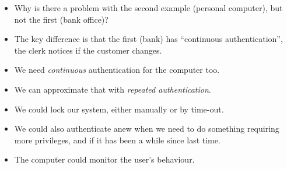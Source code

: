 \begin{frame}
  \begin{exercise}
    \begin{itemize}
      \item Why is there a problem with the second example (personal computer), 
        but not the first (bank office)?
    \end{itemize}
  \end{exercise}
\end{frame}

\begin{frame}
  \begin{remark}
    \begin{itemize}
      \item The key difference is that the first (bank) has \enquote{continuous 
          authentication}, the clerk notices if the customer changes.

      \item We need \emph{continuous} authentication for the computer too.
    \end{itemize}
  \end{remark}

  \pause

  \begin{solution}
    \begin{itemize}
      \item We can approximate that with \emph{repeated authentication}.

      \item We could lock our system, either manually or by time-out.

      \item We could also authenticate anew when we need to do something 
        requiring more privileges, and if it has been a while since last time.

      \item The computer could monitor the user's behaviour.
    \end{itemize}
  \end{solution}
\end{frame}




\begin{frame}[allowframebreaks]
	\small
  \printbibliography{}
\end{frame}

